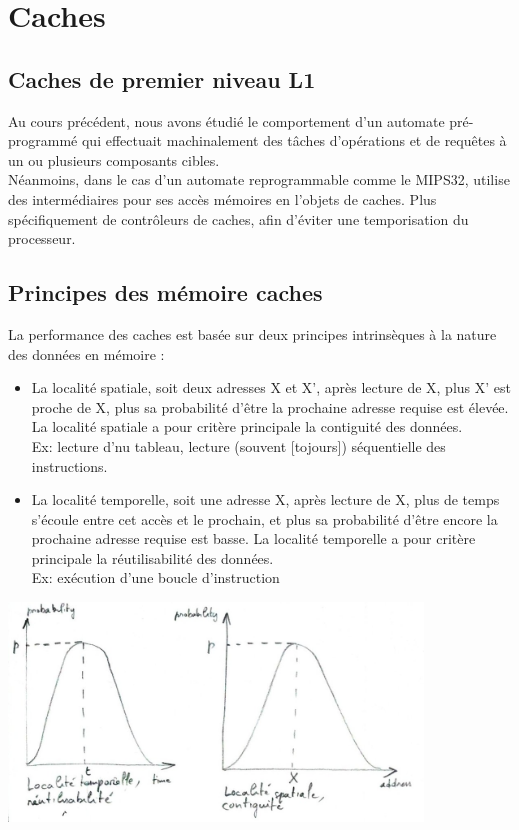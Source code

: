 \section{Caches}

\subsection{Caches de premier niveau L1}

Au cours précédent, nous avons étudié le comportement d'un automate pré-programmé
qui effectuait machinalement des tâches d'opérations et de requêtes à un ou plusieurs
composants cibles.\\Néanmoins, dans le cas d'un automate reprogrammable comme le
MIPS32, utilise des intermédiaires pour ses accès mémoires en l'objets de caches.
Plus spécifiquement de contrôleurs de caches, afin d'éviter une temporisation du
processeur.

\subsection{Principes des mémoire caches}

La performance des caches est basée sur deux principes intrinsèques à la nature
des données en mémoire :

\begin{itemize}
  \item La localité spatiale, soit deux adresses X et X', après lecture de X,
  plus X' est proche de X, plus sa probabilité d'être la prochaine adresse
  requise est élevée. La localité spatiale a pour critère principale la
  contiguité des données.\\
  Ex: lecture d'nu tableau, lecture (souvent [tojours]) séquentielle des
  instructions.
  \item La localité temporelle, soit une adresse X, après lecture de X, plus de
  temps s'écoule entre cet accès et le prochain, et plus sa probabilité d'être
  encore la prochaine adresse requise est basse. La localité temporelle a pour
  critère principale la réutilisabilité des données.\\
  Ex: exécution d'une boucle d'instruction
\end{itemize}
  \begin{center}
    \includegraphics[width=11cm]{cours3/pics/charts.jpg}
  \end{center}

